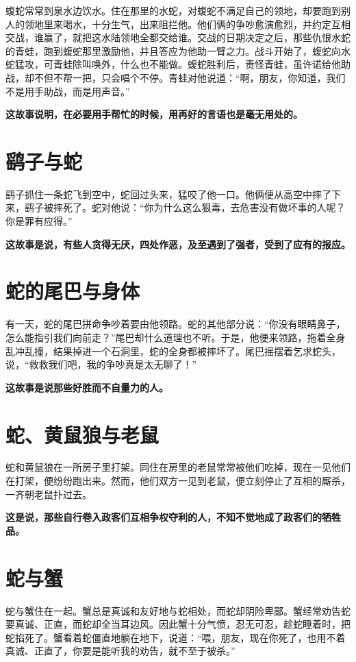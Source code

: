蝮蛇常常到泉水边饮水。住在那里的水蛇，对蝮蛇不满足自己的领地，却要跑到别人的领地里来喝水，十分生气，出来阻拦他。他们俩的争吵愈演愈烈，并约定互相交战，谁赢了，就把这水陆领地全都交给谁。交战的日期决定之后，那些仇恨水蛇的青蛙，跑到蝮蛇那里激励他，并且答应为他助一臂之力。战斗开始了，蝮蛇向水蛇猛攻，可青蛙除叫唤外，什么也不能做。蝮蛇胜利后，责怪青蛙，虽许诺给他助战，却不但不帮一把，只会唱个不停。青蛙对他说道：“啊，朋友，你知道，我们不是用手助战，而是用声音。”

{\bfseries \color{red}这故事说明，在必要用手帮忙的时候，用再好的言语也是毫无用处的。}

\section{鹞子与蛇}

鹞子抓住一条蛇飞到空中，蛇回过头来，猛咬了他一口。他俩便从高空中摔了下来，鹞子被摔死了。蛇对他说：“你为什么这么狠毒，去危害没有做坏事的人呢？你是罪有应得。”

{\bfseries \color{red}这故事是说，有些人贪得无厌，四处作恶，及至遇到了强者，受到了应有的报应。}

\section{蛇的尾巴与身体}

有一天，蛇的尾巴拼命争吵着要由他领路。蛇的其他部分说：“你没有眼睛鼻子，怎么能指引我们向前走？”尾巴却什么道理也不听。于是，他便来领路，拖着全身乱冲乱撞，结果掉进一个石洞里，蛇的全身都被摔坏了。尾巴摇摆着乞求蛇头，说，“救救我们吧，我的争吵真是太无聊了！”

{\bfseries \color{red}这故事是说那些好胜而不自量力的人。}

\section{蛇、黄鼠狼与老鼠}

蛇和黄鼠狼在一所房子里打架。同住在房里的老鼠常常被他们吃掉，现在一见他们在打架，便纷纷跑出来。然而，他们双方一见到老鼠，便立刻停止了互相的厮杀，一齐朝老鼠扑过去。

{\bfseries \color{red}这是说，那些自行卷入政客们互相争权夺利的人，不知不觉地成了政客们的牺牲品。}

\section{蛇与蟹}

蛇与蟹住在一起。蟹总是真诚和友好地与蛇相处，而蛇却阴险卑鄙。蟹经常劝告蛇要真诚、正直，而蛇却全当耳边风。因此蟹十分气愤，忍无可忍，趁蛇睡着时，把蛇掐死了。蟹看着蛇僵直地躺在地下，说道：“喂，朋友，现在你死了，也用不着真诚、正直了，你要是能听我的劝告，就不至于被杀。”

